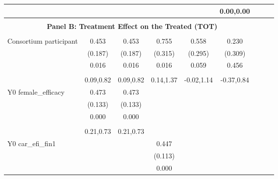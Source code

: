 \begin{table}[!h]
\begin{adjustbox}{width=\columnwidth,center}
\begin{tabular}{l*{8}{c}}
                    &                     &                     &                     &                     &   0.00,0.00         \\
\hline \\ \multicolumn{7}{c}{\textbf{Panel B: Treatment Effect on the Treated (TOT)}} \\\\[-1ex]
Consortium participant&       0.453\sym{**} &       0.453\sym{**} &       0.755\sym{**} &       0.558\sym{*}  &       0.230         \\
                    &     (0.187)         &     (0.187)         &     (0.315)         &     (0.295)         &     (0.309)         \\
                    &       0.016         &       0.016         &       0.016         &       0.059         &       0.456         \\
                    &                     &                     &                     &                     &                     \\
                    &   0.09,0.82         &   0.09,0.82         &   0.14,1.37         &  -0.02,1.14         &  -0.37,0.84         \\
Y0 female\_efficacy  &       0.473\sym{***}&       0.473\sym{***}&                     &                     &                     \\
                    &     (0.133)         &     (0.133)         &                     &                     &                     \\
                    &       0.000         &       0.000         &                     &                     &                     \\
                    &                     &                     &                     &                     &                     \\
                    &   0.21,0.73         &   0.21,0.73         &                     &                     &                     \\
Y0 car\_efi\_fin1     &                     &                     &       0.447\sym{***}&                     &                     \\
                    &                     &                     &     (0.113)         &                     &                     \\
                    &                     &                     &       0.000         &                     &                     \\

\end{tabular}
\end{adjustbox}
\end{table}
